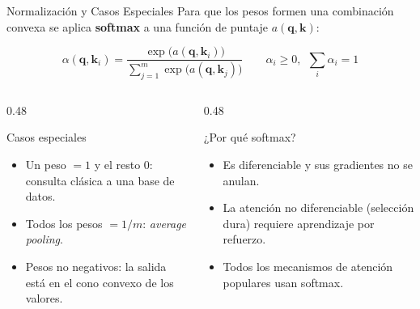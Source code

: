 \documentclass[aspectratio=169, 10pt]{beamer}
\newcommand{\qv}{\mathbf{q}}
\newcommand{\kv}{\mathbf{k}}
\newcommand{\formula}[1]{%
	\begin{tcolorbox}[colback=UCMBlue!8, colframe=UCMBlue, arc=4pt,
		boxsep=2pt, left=6pt, right=6pt, top=3pt, bottom=3pt]
		#1
	\end{tcolorbox}
}
\begin{document}
\begin{frame}{Normalizaci\'on y Casos Especiales}
	Para que los pesos formen una combinaci\'on convexa se aplica \textbf{softmax} a una funci\'on de puntaje $a(\qv,\kv)$:
	\formula{
		\[
		\alpha(\qv,\kv_i)=\frac{\exp\big(a(\qv,\kv_i)\big)}{\sum_{j=1}^{m}\exp\big(a(\qv,\kv_j)\big)}
		\qquad \alpha_i\ge 0,\ \ \sum_i\alpha_i=1
		\]
	}
	\begin{columns}[T]
		\begin{column}{0.48\textwidth}
			\begin{block}{Casos especiales}
				\small
				\begin{itemize}
					\item Un peso $=1$ y el resto $0$: consulta cl\'asica a una base de datos.
					\item Todos los pesos $=1/m$: \emph{average pooling}.
					\item Pesos no negativos: la salida est\'a en el cono convexo de los valores.
				\end{itemize}
			\end{block}
		\end{column}
		\begin{column}{0.48\textwidth}
			\begin{block}{¿Por qu\'e softmax?}
				\small
				\begin{itemize}
					\item Es diferenciable y sus gradientes no se anulan.
					\item La atenci\'on no diferenciable (selecci\'on dura) requiere aprendizaje por refuerzo.
					\item Todos los mecanismos de atenci\'on populares usan softmax.
				\end{itemize}
			\end{block}
		\end{column}
	\end{columns}
\end{frame}
\end{document}
